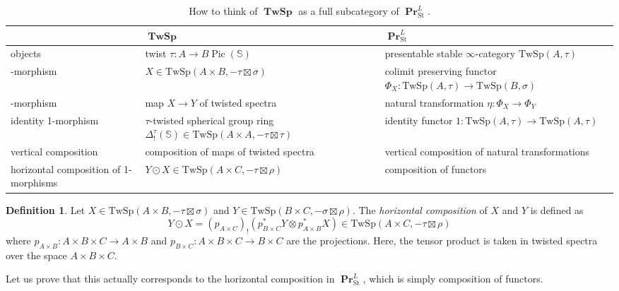 \documentclass[10pt]{amsart}
\theoremstyle{plain}
\theoremstyle{definition}
\newtheorem{definition}[theorem]{Definition}
\DeclareMathOperator{\Pic}{Pic}
\DeclareMathOperator{\PPr}{\mathbf{Pr}}
\DeclareMathOperator{\TTwSp}{\mathbf{TwSp}}
\newcommand{\St}{\mathrm{St}}
\newcommand{\bS}{\mathbb{S}}
\newcommand{\TwSp}{\mathrm{TwSp}}
\begin{document}
\begin{table}[h!]
\centering
  \begin{tabular}{ | m{3.5cm} | m{6cm} | m{6cm} | }
    \hline
    & \centering $\TTwSp$ & \centering $\PPr_{\St}^L$  \tabularnewline
    \hline
    \centering objects & \centering twist $\tau : A \to B\Pic(\bS)$ & \centering presentable stable $\infty$-category \newline $\TwSp(A,\tau)$ \tabularnewline
    \hline
    \centering 1-morphism & \centering $X \in \TwSp(A \times B , -\tau \boxtimes \sigma)$ & \centering colimit preserving functor \newline $\Phi_X : \TwSp(A,\tau) \to \TwSp(B,\sigma)$ \tabularnewline
    \hline
    \centering 2-morphism & \centering map $X \to Y$ of twisted spectra & \centering natural transformation \newline $\eta : \Phi_X \to \Phi_Y$   \tabularnewline
    \hline
    \centering identity 1-morphism & \centering $\tau$-twisted spherical group ring \newline $\Delta_!^{\tau}(\bS) \in \TwSp(A \times A,-\tau \boxtimes \tau)$ & \centering identity functor \newline $1 : \TwSp(A,\tau) \to \TwSp(A,\tau)$   \tabularnewline
    \hline
    \centering vertical composition  & \centering composition of maps of twisted spectra & \centering vertical composition of natural transformations \tabularnewline
    \hline
    \centering horizontal composition of 1-morphisms &  \centering $Y \odot X \in \TwSp(A \times C , -\tau \boxtimes \rho)$ & \centering composition of functors \tabularnewline
    \hline
  \end{tabular}
  \caption{How to think of $\TTwSp$ as a full subcategory of $\PPr^L_{\St}$.}
  \label{table:infty2TwSp}
\end{table}

\begin{definition}
  Let $X \in \TwSp(A \times B, -\tau \boxtimes \sigma)$ and $Y \in \TwSp(B \times C , -\sigma \boxtimes \rho)$. The \emph{horizontal composition} of $X$ and $Y$ is defined as
  \[
  Y \odot X = (p_{A \times C})_!(p^*_{B \times C} Y \otimes p_{A \times B}^* X) \in \TwSp(A \times C, -\tau \boxtimes \rho)
  \]
  where $p_{A \times B} : A \times B \times C \to A \times B$ and $p_{B \times C} : A \times B \times C \to B \times C$ are the projections. Here, the tensor product is taken in twisted spectra over the space $A \times B \times C$.
\end{definition}

Let us prove that this actually corresponds to the horizontal composition in $\PPr^{L}_{\St}$, which is simply composition of functors.
\end{document}
